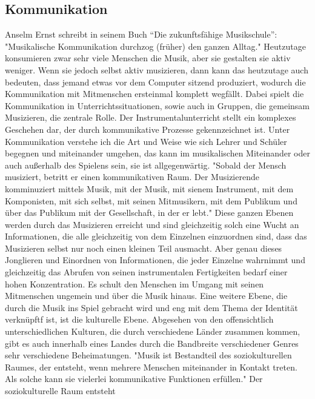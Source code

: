\subsection{Kommunikation}
Anselm Ernst schreibt in seinem Buch \enquote{Die zukunftsfähige Musikschule}:
"Musikalische Kommunikation durchzog (früher) den ganzen Alltag."
\autocite[37]{ernst:die_zukunftsfaehige_musikschule} Heutzutage konsumieren zwar
sehr viele Menschen die Musik, aber sie gestalten sie aktiv weniger. Wenn sie
jedoch selbst aktiv musizieren, dann kann das heutzutage auch bedeuten, dass
jemand etwas vor dem Computer sitzend produziert, wodurch die Kommunikation mit
Mitmenschen ersteinmal komplett wegfällt. Dabei spielt die Kommunikation in
Unterrichtssituationen, sowie auch in Gruppen, die gemeinsam Musizieren, die
zentrale Rolle. Der Instrumentalunterricht stellt ein komplexes Geschehen dar,
der durch kommunikative Prozesse gekennzeichnet ist. Unter Kommunikation
verstehe ich die Art und Weise wie sich Lehrer und Schüler begegnen und
miteinander umgehen, das kann im musikalischen Miteinander oder auch außerhalb
des Spielens sein, sie ist allgegenwärtig. "Sobald der Mensch musiziert, betritt
er einen kommunikativen Raum. Der Musizierende komminuziert mittels Musik, mit
der Musik, mit sienem Instrument, mit dem Komponisten, mit sich selbst, mit
seinen Mitmusikern, mit dem Publikum und über das Publikum mit der Gesellschaft,
in der er lebt." \autocite[56]{doerne:umfassend_musizieren} Diese ganzen Ebenen
werden durch das Musizieren erreicht und sind gleichzeitig solch eine Wucht an
Informationen, die alle gleichzeitig von dem Einzelnen einzuordnen sind, dass
das Musizieren selbst nur noch einen kleinen Teil ausmacht. Aber genau dieses
Jonglieren und Einordnen von Informationen, die jeder Einzelne wahrnimmt und
gleichzeitig das Abrufen von seinen instrumentalen Fertigkeiten bedarf einer
hohen Konzentration. Es schult den Menschen im Umgang mit seinen Mitmenschen
ungemein und über die Musik hinaus. Eine weitere Ebene, die durch die Musik ins
Spiel gebracht wird und eng mit dem Thema der Identität verknüpftf ist, ist die
kulturelle Ebene. Abgesehen von den offensichtlich unterschiedlichen Kulturen,
die durch verschiedene Länder zusammen kommen, gibt es auch innerhalb eines
Landes durch die Bandbreite verschiedener Genres sehr verschiedene
Beheimatungen. "Musik ist Bestandteil des soziokulturellen Raumes, der entsteht,
wenn mehrere Menschen miteinander in Kontakt treten. Als solche kann sie
vielerlei kommunikative Funktionen erfüllen."
\autocite[56]{doerne:umfassend_musizieren} Der soziokulturelle Raum entsteht
